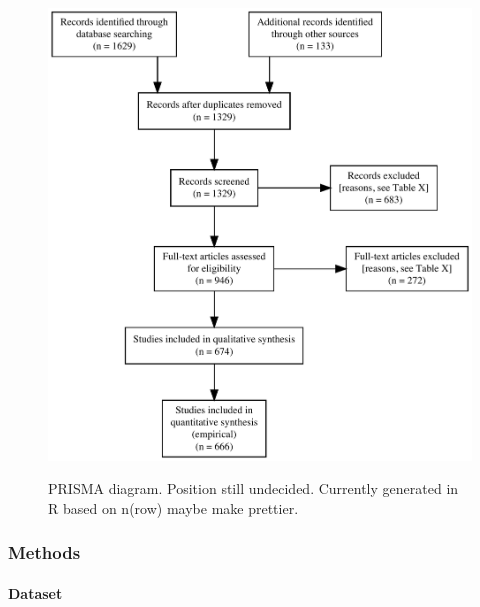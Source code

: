 \begin{figure}[h]
\centering
\caption{PRISMA diagram. Position still undecided. Currently generated in R based on n(row) maybe make prettier.}
\includegraphics[width=\textwidth]{Figures/PRISMA}
\label{fig:PRISMA}
\end{figure}

\subsubsection{Methods}

\paragraph{Dataset}

